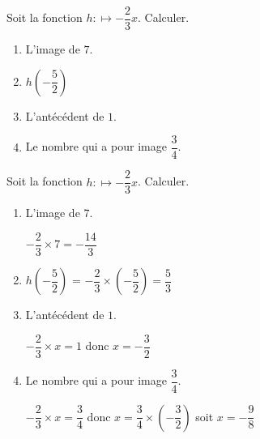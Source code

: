 \begin{exercice}
    Soit la fonction $h:\longmapsto -\dfrac{2}{3}x$. Calculer.
    \begin{enumerate}        
        \item L'image de $7$.\smallskip
        \item $h\left(-\dfrac{5}{2}\right)$\smallskip
        \item L'antécédent de $1$.
        \item Le nombre qui a pour image $\dfrac{3}{4}$.
    \end{enumerate}
\end{exercice}
\begin{corrige}
    Soit la fonction $h:\longmapsto -\dfrac{2}{3}x$. Calculer.

    \begin{enumerate}        
        \item L'image de $7$.
        
        {\red $-\dfrac{2}{3}\times 7 = -\dfrac{14}{3}$}
        \item $h\left(-\dfrac{5}{2}\right)$ {\red = $-\dfrac{2}{3}\times \left(-\dfrac{5}{2}\right) = \dfrac{5}{3}$}        
        \item L'antécédent de $1$.
        
        {\red $-\dfrac{2}{3}\times x=1$ donc $x=-\dfrac{3}{2}$}
        \item Le nombre qui a pour image $\dfrac{3}{4}$.
        
        {\red $-\dfrac{2}{3}\times x = \dfrac{3}{4}$ donc $x=\dfrac{3}{4}\times \left(-\dfrac{3}{2}\right)$ soit $x=-\dfrac{9}{8}$}
    \end{enumerate}
\end{corrige}
